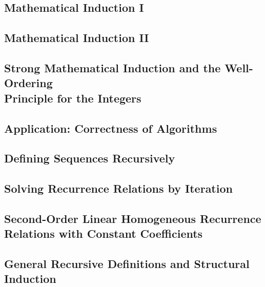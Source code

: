 \subsection{Mathematical Induction I}


\subsection{Mathematical Induction II}


\subsection{Strong Mathematical Induction and the Well-Ordering \\ Principle for the Integers}


\subsection{Application: Correctness of Algorithms}


\subsection{Defining Sequences Recursively}


\subsection{Solving Recurrence Relations by Iteration}


\subsection{Second-Order Linear Homogeneous Recurrence Relations with Constant Coefficients}


\subsection{General Recursive Definitions and Structural Induction}

